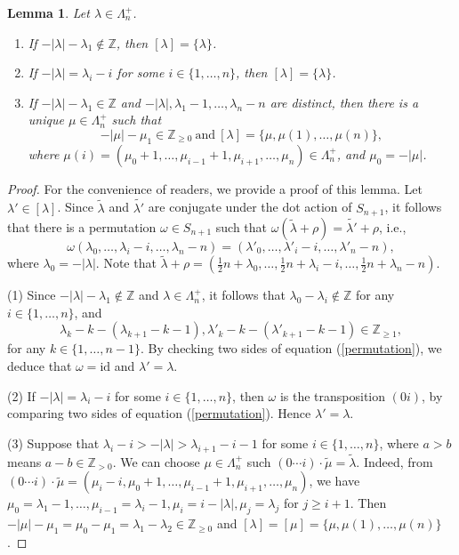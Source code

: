 \documentclass[12pt,a4paper]{amsart}
\newtheorem{lemma}[theorem]{Lemma}%
\numberwithin{equation}{section}
\newcommand{\Z}{\mathbb{Z}}
\def\l{\lambda}
\begin{document}
\begin{lemma}\label{centra-class}  Let $\l\in \Lambda_n^+$.
\begin{enumerate}
\item If $-|\l|-\l_1\not\in \Z$, then $[\l]=\{\l\}$.
\item If $-|\l|=\l_i-i$ for some $i\in\{1,\dots,n\}$, then $[\l]=\{\l\}$.
\item If $-|\l|-\l_1\in \Z$ and $-|\l|,\l_1-1,\dots, \l_n-n$ are distinct, then there is a unique $\mu\in \Lambda_n^+$ such that $$-|\mu|-\mu_1\in \Z_{\geq 0}\ \text{and}\
[\l]=\{\mu,\mu(1),\dots,\mu(n)\},$$
where $\mu(i)=(\mu_0+1,\dots,\mu_{i-1}+1,\mu_{i+1},\dots,\mu_n)\in \Lambda_n^+$, and $\mu_0=-|\mu|$.
\end{enumerate}
\end{lemma}

\begin{proof} For the convenience of readers, we provide a proof of this lemma.
 Let $\l'\in [\l]$. Since
$\widetilde{\l}$ and $\widetilde{\l'}$ are conjugate under the dot action of  $S_{n+1}$, it follows that there is a permutation $\omega\in S_{n+1}$
such that $\omega(\widetilde{\l}+\rho)=\widetilde{\l'}+\rho$, i.e.,
\begin{equation}\label{permutation}\omega(\l_0,\dots,\l_i-i,\dots,\l_n-n)
=(\l'_0,\dots,\l'_i-i,\dots,\l'_n-n),\end{equation}
where $\l_0=-|\l|$. Note that $\widetilde{\l}+\rho
=(\frac{1}{2}n+\l_0,\dots,\frac{1}{2}n+\l_i-i,\dots,\frac{1}{2}n+\l_n-n)$.

(1) Since $-|\l|-\l_1\not\in \Z$ and $\l\in \Lambda_n^+$, it follows that $\l_0-\l_i\not\in \Z$ for any $i\in \{1,\dots,n\}$, and $$\l_k-k-(\l_{k+1}-k-1),\l'_k-k-(\l'_{k+1}-k-1)\in \Z_{\geq 1},$$ for any $k\in \{1,\dots,n-1\}$. By checking   two sides of equation (\ref{permutation}),
 we deduce that $\omega=\mathrm{id}$ and $\l'=\l$.

(2) If $-|\l|=\l_i-i$ for some $i\in\{1,\dots,n\}$, then   $\omega$ is the transposition $(0i)$, by comparing   two sides of equation (\ref{permutation}). Hence
$\l'=\l$.

(3) Suppose that $\l_i-i>-|\l|>\l_{i+1}-i-1$ for some $i\in\{1,\dots,n\}$, where $a>b$ means $a-b\in \Z_{>0}$. We can choose  $\mu\in \Lambda_n^+$ such $(0\cdots i)\cdot \widetilde{\mu}= \widetilde{\l}$.
Indeed, from $(0\cdots i)\cdot \widetilde{\mu}=
(\mu_i-i,\mu_0+1,\dots,\mu_{i-1}+1,\mu_{i+1},\dots,\mu_n)$,
we have
$\mu_0=\l_1-1,\dots,\mu_{i-1}=\l_i-1,\mu_i=i-|\l|, \mu_{j}=\l_j$ for $j\geq i+1$.
Then $-|\mu|-\mu_1=\mu_0-\mu_1=\l_1-\l_2\in \Z_{\geq 0}$ and
$[\l]=[\mu]=\{\mu,\mu(1),\dots,\mu(n)\}$.
\end{proof}
\end{document}

